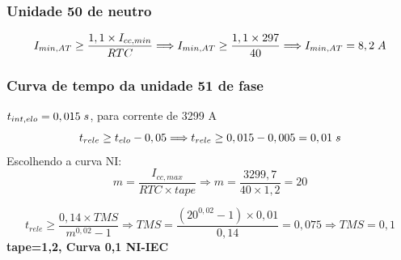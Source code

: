 \subsubsection{Unidade 50 de neutro}
\begin{equation*}
{I}_{min,AT} \geq \frac{1,1\times {I}_{cc,min}}{RTC} \Longrightarrow {I}_{min,AT} \geq \frac{1,1\times 297}{40} \Longrightarrow {I}_{min,AT}=8,2 \hspace{0.1cm}A
\end{equation*}

\subsubsection{Curva de tempo da unidade 51 de fase}
${t}_{int,elo}=0,015 \hspace{0.1cm}s$, para corrente de 3299 A
\begin{equation*}
{t}_{rele} \geq {t}_{elo} - 0,05 \Longrightarrow {t}_{rele} \geq 0,015 - 0,005=0,01 \hspace{0.1cm}s
\end{equation*}
Escolhendo a curva NI:
\begin{equation*}
m=\frac{{I}_{cc,max}}{RTC\times tape} \Longrightarrow m= \frac{3299,7}{40\times 1,2}=20 
\end{equation*}

\begin{equation*}
{t}_{rele} \geq \frac{0,14 \times TMS}{m^{0,02}-1} \Longrightarrow TMS= \frac{(20^{0,02}-1)\times 0,01}{0,14}=0,075 \Longrightarrow TMS=0,1
\end{equation*}
\textbf{tape=1,2, Curva 0,1 NI-IEC}

